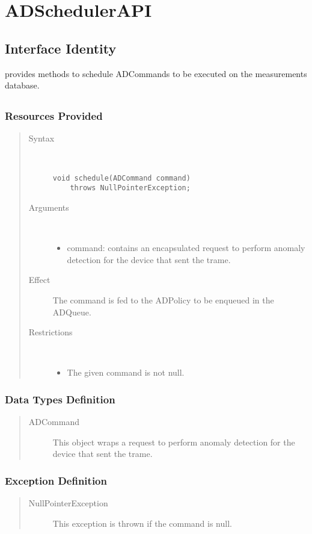 \section{ADSchedulerAPI}
\label{api:ad-scheduler-api}

\subsection{Interface Identity}

\npar {} provides methods to schedule
ADCommands to be executed on the measurements database.

\subsection{}

\subsubsection{Resources Provided}

\begin{quote}
	\begin{description}
		\item[Syntax] \ 
		\begin{verbatim}
void schedule(ADCommand command)
    throws NullPointerException;
		\end{verbatim}
		\item[Arguments] \
		\begin{itemize}
			\item command: contains an encapsulated request to perform anomaly detection
			for the device that sent the trame.
		\end{itemize}
		\item[Effect] The command is fed to the ADPolicy to be enqueued in the
		ADQueue.
		\item[Restrictions] \ 
		\begin{itemize}
			\item The given command is not null.
		\end{itemize}
	\end{description} 
\end{quote}

\subsubsection{Data Types Definition}

\begin{quote}
	\begin{description}
		\item[ADCommand] This object wraps a request to perform anomaly detection for
		the device that sent the trame.	
	\end{description} 
\end{quote}

\subsubsection{Exception Definition}

\begin{quote}
	\begin{description}
		\item[NullPointerException] This exception is thrown if the command is null.
	\end{description} 
\end{quote}